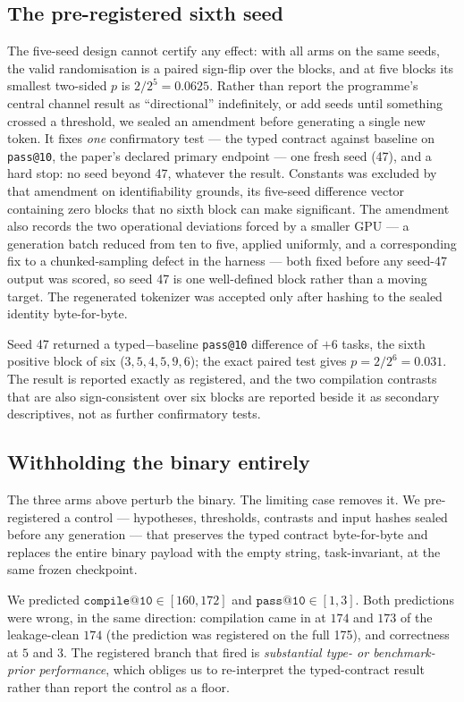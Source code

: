 \documentclass[conference]{IEEEtran}
\makeatletter
\newcommand{\passat}[1]{\texttt{pass@#1}\xspace}
\newcommand{\compileat}[1]{\texttt{compile@#1}\xspace}
\makeatother
\begin{document}
\subsection{The pre-registered sixth seed}
\label{sec:seed47}
The five-seed design cannot certify any effect: with all arms on the same seeds,
the valid randomisation is a paired sign-flip over the blocks, and at five blocks
its smallest two-sided $p$ is $2/2^5=0.0625$. Rather than report the programme's
central channel result as ``directional'' indefinitely, or add seeds until
something crossed a threshold, we sealed an amendment before generating a single
new token. It fixes \emph{one} confirmatory test --- the typed contract against
baseline on \passat{10}, the paper's declared primary endpoint --- one fresh seed
(47), and a hard stop: no seed beyond 47, whatever the result. Constants was
excluded by that amendment on identifiability grounds, its five-seed difference
vector containing zero blocks that no sixth block can make significant. The
amendment also records the two operational deviations forced by a smaller GPU ---
a generation batch reduced from ten to five, applied uniformly, and a
corresponding fix to a chunked-sampling defect in the harness --- both fixed
before any seed-47 output was scored, so seed 47 is one well-defined block rather
than a moving target. The regenerated tokenizer was accepted only after hashing
to the sealed identity byte-for-byte.

Seed 47 returned a typed$-$baseline \passat{10} difference of $+6$ tasks, the
sixth positive block of six ($3,5,4,5,9,6$); the exact paired test gives
$p{=}2/2^6=0.031$. The result is reported exactly as registered, and the two
compilation contrasts that are also sign-consistent over six blocks are reported
beside it as secondary descriptives, not as further confirmatory tests.

\subsection{Withholding the binary entirely}
\label{sec:nobinary}
The three arms above perturb the binary. The limiting case removes it. We
pre-registered a control --- hypotheses, thresholds, contrasts and input hashes
sealed before any generation --- that preserves the typed contract byte-for-byte
and replaces the entire binary payload with the empty string, task-invariant, at
the same frozen checkpoint.

We predicted $\compileat{10}\in[160,172]$ and $\passat{10}\in[1,3]$. Both
predictions were wrong, in the same direction: compilation came in at $174$ and
$173$ of the leakage-clean $174$ (the prediction was registered on the full
175), and correctness at $5$ and $3$. The registered branch that fired
is \emph{substantial type- or benchmark-prior performance}, which obliges us to
re-interpret the typed-contract result rather than report the control as a floor.
\end{document}
